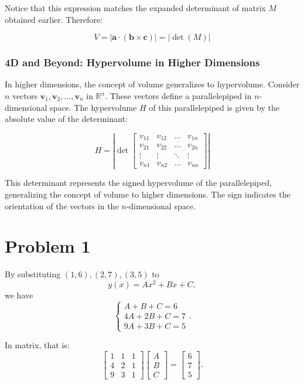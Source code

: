 \documentclass[12pt,a4paper]{article}
\begin{document}
Notice that this expression matches the expanded determinant of matrix \(M\) obtained earlier. Therefore:

\[
V = \left| \mathbf{a} \cdot (\mathbf{b} \times \mathbf{c}) \right| = \left| \det(M) \right|
\]
\subsubsection*{4D and Beyond: Hypervolume in Higher Dimensions}

In higher dimensions, the concept of volume generalizes to hypervolume. Consider \(n\) vectors \(\mathbf{v}_1, \mathbf{v}_2, \dots, \mathbf{v}_n\) in \(\mathbb{R}^n\). These vectors define a parallelepiped in \(n\)-dimensional space. The hypervolume \(H\) of this parallelepiped is given by the absolute value of the determinant:

\[
H = \left|\det\begin{bmatrix} 
v_{11} & v_{12} & \dots & v_{1n} \\
v_{21} & v_{22} & \dots & v_{2n} \\
\vdots & \vdots & \ddots & \vdots \\
v_{n1} & v_{n2} & \dots & v_{nn}
\end{bmatrix}\right|
\]

This determinant represents the signed hypervolume of the parallelepiped, generalizing the concept of volume to higher dimensions. The sign indicates the orientation of the vectors in the \(n\)-dimensional space.


\section*{Problem 1}
\begin{solution}
By substituting $(1,6), (2,7),(3,5)$ to
\begin{equation}
\label{givenw3}
y(x)= Ax^2+B x+C,
\end{equation}
we have 
$$\begin{cases}
A + B + C = 6\\
4A + 2B + C = 7\\
9A + 3B + C = 5
\end{cases}.
$$

In matrix, that is:
\[
\begin{bmatrix}
1 & 1 & 1 \\
4 & 2 & 1 \\
9 & 3 & 1
\end{bmatrix}
\begin{bmatrix}
A \\
B \\
C
\end{bmatrix}
=
\begin{bmatrix}
6 \\
7 \\
5
\end{bmatrix}.
\]
\end{solution}
\end{document}
